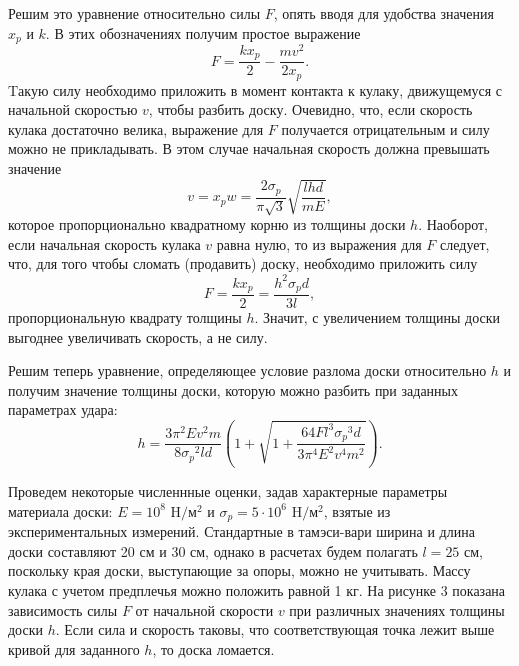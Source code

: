 \documentclass[a4paper,12pt]{article} %
\begin{document}
Решим это уравнение относительно силы $F$, опять вводя для удобства значения $x_p$ и $k$. В этих обозначениях получим простое выражение $$F = \dfrac{kx_p}{2} - \dfrac{mv^2}{2x_p}.$$ Tакую силу необходимо приложить в момент контакта к кулаку, движущемуся с начальной скоростью $v$, чтобы разбить доску. Очевидно, что, если скорость кулака достаточно велика, выражение для $F$ получается отрицательным и силу можно не прикладывать. В этом случае начальная скорость должна превышать значение $$v = x_pw = \dfrac{2\sigma_p}{\pi\sqrt{3}}\sqrt{\dfrac{lhd}{mE}},$$ которое пропорционально квадратному корню из толщины доски $h$. Наоборот, если начальная скорость кулака $v$ равна нулю, то из выражения для $F$ следует, что, для того чтобы сломать (продавить) доску, необходимо приложить силу $$F = \dfrac{kx_p}{2} = \dfrac{h^2\sigma_pd}{3l},$$ пропорциональную квадрату толщины $h$. Значит, с увеличением толщины доски выгоднее увеличивать скорость, а не силу.

Решим теперь уравнение, определяющее условие разлома доски относительно $h$ и получим значение толщины доски, которую можно разбить при заданных параметрах удара: $$h = \dfrac{3\pi^2Ev^2m}{8{\sigma_p}^2ld}\left(1 + \sqrt{1 + \dfrac{64Fl^3{\sigma_p}^3d}{3\pi^4E^2v^4m^2}}\right).$$

Проведем некоторые численнные оценки, задав характерные параметры материала доски: $E = 10^8$ H$/м^2$ и $\sigma_p = 5\cdot10^6$ H$/м^2$, взятые из экспериментальных измерений. Стандартные в тамэси-вари ширина и длина доски составляют 20 см и 30 см, однако в расчетах будем полагать $l = 25$ см, поскольку края доски, выступающие за опоры, можно не учитывать. Массу кулака с учетом предплечья можно положить равной 1 кг. На рисунке 3 показана зависимость силы $F$ от начальной скорости $v$ при различных значениях толщины доски $h$. Если сила и скорость таковы, что соответствующая точка лежит выше кривой для заданного $h$, то доска ломается.
\end{document}
